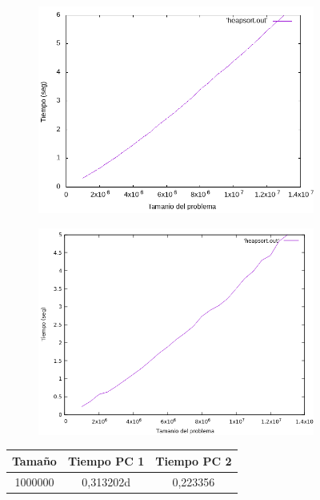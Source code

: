 \documentclass[12pt,spanish]{article}
\begin{document}
\begin{figure}[H]
\centering
\begin{subfigure}[b]{0.45\textwidth}
\includegraphics[scale=0.45]{empirica_heapsort.png}
\caption{}
\end{subfigure}
\quad
\begin{subfigure}[b]{0.45\textwidth}
\includegraphics[scale=0.45]{empirica_heapsort_2.png}
\caption{}
\end{subfigure}
\begin{tabular}{|c|c|c|}
\hline
\textbf{Tamaño} & \textbf{Tiempo PC 1} & \textbf{Tiempo PC 2} \\
\hline
1000000 & 0,313202d & 0,223356 \\

\end{tabular}
\end{figure}
\end{document}
